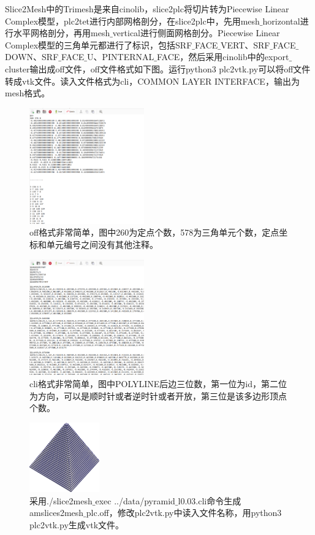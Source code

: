 Slice2Mesh中的Trimesh是来自cinolib，slice2plc将切片转为Piecewise Linear Complex模型，plc2tet进行内部网格剖分，在slice2plc中，先用mesh$\_$horizontal进行水平网格剖分，再用mesh$\_$vertical进行侧面网格剖分。Piecewise Linear Complex模型的三角单元都进行了标识，包括SRF$\_$FACE$\_$VERT、SRF$\_$FACE$\_$DOWN、SRF$\_$FACE$\_$U、PINTERNAL$\_$FACE，然后采用cinolib中的export$\_$cluster输出成off文件，off文件格式如下图。运行python3 plc2vtk.py可以将off文件转成vtk文件。读入文件格式为cli，COMMON LAYER INTERFACE，输出为mesh格式。

\begin{figure}[!htbp]
  \centering
  \includegraphics[height=5cm]{fig/1/1.1.7.1:0.png}
  \caption{off格式非常简单，图中260为定点个数，578为三角单元个数，定点坐标和单元编号之间没有其他注释。}
  \label{fig:1-7}
\end{figure}

\begin{figure}[!htbp]
  \centering
  \includegraphics[height=5cm]{fig/1/1.1.7.1:00.png}
  \caption{cli格式非常简单，图中POLYLINE后边三位数，第一位为id，第二位为方向，可以是顺时针或者逆时针或者开放，第三位是该多边形顶点个数。}
  \label{fig:1-7}
\end{figure}

\begin{figure}[!htbp]
  \centering
  \includegraphics[height=3cm]{fig/1/1.1.7.1:1.png}
  \caption{采用./slice2mesh$\_$exec ../data/pyramid$\_$l0.03.cli命令生成amslices2mesh$\_$plc.off，修改plc2vtk.py中读入文件名称，用python3 plc2vtk.py生成vtk文件。}
  \label{fig:1-7}
\end{figure}

